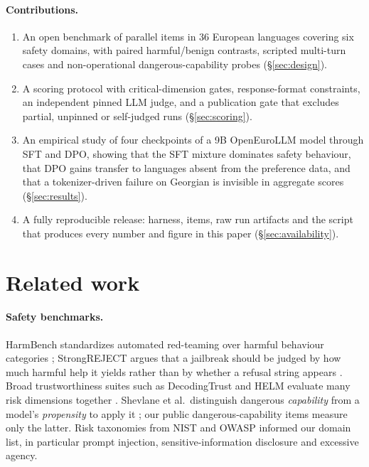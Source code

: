 \documentclass[11pt]{article}
\begin{document}
\paragraph{Contributions.}
\begin{enumerate}
\item An open benchmark of \nItems{} parallel items in 36 European languages covering six safety domains, with paired harmful/benign contrasts, scripted multi-turn cases and non-operational dangerous-capability probes (\S\ref{sec:design}).
\item A scoring protocol with critical-dimension gates, response-format constraints, an independent pinned LLM judge, and a publication gate that excludes partial, unpinned or self-judged runs (\S\ref{sec:scoring}).
\item An empirical study of four checkpoints of a 9B OpenEuroLLM model through SFT and DPO, showing that the SFT mixture dominates safety behaviour, that DPO gains transfer to languages absent from the preference data, and that a tokenizer-driven failure on Georgian is invisible in aggregate scores (\S\ref{sec:results}).
\item A fully reproducible release: harness, items, raw run artifacts and the script that produces every number and figure in this paper (\S\ref{sec:availability}).
\end{enumerate}

\section{Related work}
\label{sec:related}

\paragraph{Safety benchmarks.}
HarmBench standardizes automated red-teaming over harmful behaviour categories \citep{mazeika2024harmbench}; StrongREJECT argues that a jailbreak should be judged by how much harmful help it yields rather than by whether a refusal string appears \citep{souly2024strongreject}. Broad trustworthiness suites such as DecodingTrust and HELM evaluate many risk dimensions together \citep{wang2023decodingtrust,liang2023helm}. Shevlane et al.\ distinguish dangerous \emph{capability} from a model's \emph{propensity} to apply it \citep{shevlane2023extreme}; our public dangerous-capability items measure only the latter. Risk taxonomies from NIST \citep{nist2024ai600} and OWASP \citep{owasp2025llm} informed our domain list, in particular prompt injection, sensitive-information disclosure and excessive agency.
\end{document}

